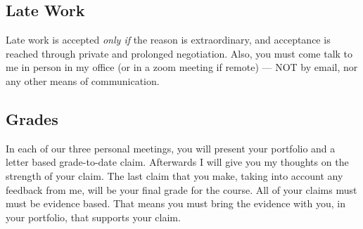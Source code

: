 \documentclass[12pt]{amsart}
\begin{document}
\subsection{Late Work} Late work is accepted \textit{only if} the reason is extraordinary, and acceptance is reached through private and prolonged negotiation. Also, you must come talk to me in person in my office (or in a zoom meeting if remote) --- NOT by email, nor any other means of communication.

\subsection{Grades} In each of our three personal meetings, you will present your portfolio and a letter based grade-to-date claim. Afterwards I will give you my thoughts on the strength of your claim. The last claim that you make, taking into account any feedback from me, will be your final grade for the course. All of your claims must must be evidence based. That means you must bring the evidence with you, in your portfolio, that supports your claim. 
\end{document}
